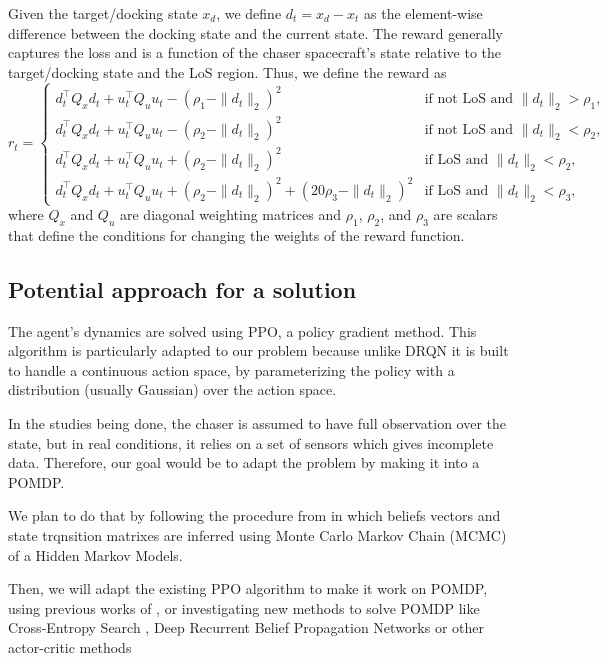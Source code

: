 \documentclass[12pt]{article}
\begin{document}
Given the target/docking state $x_d$, we define $d_t = x_d - x_t$ as the element-wise difference between
the docking state and the current state. The reward generally captures the loss and is a function of
the chaser spacecraft’s state relative to the target/docking state and the LoS region. Thus, we define
the reward as
\[
r_t =
\begin{cases}
d_t^\top Q_x d_t + u_t^\top Q_u u_t - (\rho_1 - \|d_t\|_2)^2 & \text{if not LoS and } \|d_t\|_2 > \rho_1, \\[6pt]
d_t^\top Q_x d_t + u_t^\top Q_u u_t - (\rho_2 - \|d_t\|_2)^2 & \text{if not LoS and } \|d_t\|_2 < \rho_2, \\[6pt]
d_t^\top Q_x d_t + u_t^\top Q_u u_t + (\rho_2 - \|d_t\|_2)^2 & \text{if LoS and } \|d_t\|_2 < \rho_2, \\[6pt]
d_t^\top Q_x d_t + u_t^\top Q_u u_t + (\rho_2 - \|d_t\|_2)^2 + (20\rho_3 - \|d_t\|_2)^2 & \text{if LoS and } \|d_t\|_2 < \rho_3,
\end{cases}
\]
where $Q_x$ and $Q_u$ are diagonal weighting matrices and $\rho_1$, $\rho_2$, and $\rho_3$ are scalars that define the
conditions for changing the weights of the reward function.

\subsection*{Potential approach for a solution}
The agent's dynamics are solved using PPO, a policy gradient method. This algorithm is particularly adapted to our problem because unlike DRQN it is built to handle a continuous action space, by parameterizing the policy with a distribution (usually Gaussian) over the action space. 

In the studies being done, the chaser is assumed to have full observation over the state, but in real conditions, it relies on a set of sensors which gives incomplete data. Therefore, our goal would be to adapt the problem by making it into a POMDP. 

We plan to do that by following the procedure from \cite{Arcieri} in which beliefs vectors and state trqnsition matrixes are inferred using Monte Carlo Markov Chain (MCMC) of a Hidden Markov Models. 

Then, we will adapt the existing PPO algorithm to make it work on POMDP, using previous works of \cite{Yue}, or investigating new methods to solve POMDP like Cross-Entropy Search \cite{Hoerger},  Deep Recurrent Belief Propagation Networks \cite{Wang} or other actor-critic methods \cite{He}





\newpage



\end{document}
